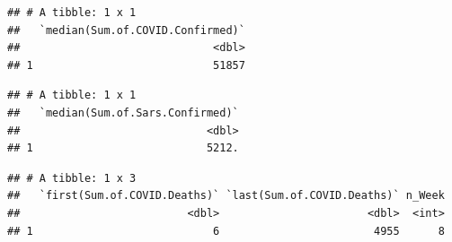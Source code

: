 \documentclass[
]{article}
\newenvironment{Shaded}{\begin{snugshade}}{\end{snugshade}}
\newcommand{\DataTypeTok}[1]{\textcolor[rgb]{0.13,0.29,0.53}{#1}}
\newcommand{\DecValTok}[1]{\textcolor[rgb]{0.00,0.00,0.81}{#1}}
\newcommand{\KeywordTok}[1]{\textcolor[rgb]{0.13,0.29,0.53}{\textbf{#1}}}
\newcommand{\NormalTok}[1]{#1}
\newcommand{\OperatorTok}[1]{\textcolor[rgb]{0.81,0.36,0.00}{\textbf{#1}}}
\newcommand{\StringTok}[1]{\textcolor[rgb]{0.31,0.60,0.02}{#1}}
\begin{document}
\begin{Shaded}
\end{Shaded}

\begin{verbatim}
## # A tibble: 1 x 1
##   `median(Sum.of.COVID.Confirmed)`
##                              <dbl>
## 1                            51857
\end{verbatim}

\begin{Shaded}
\end{Shaded}

\begin{verbatim}
## # A tibble: 1 x 1
##   `median(Sum.of.Sars.Confirmed)`
##                             <dbl>
## 1                           5212.
\end{verbatim}

\begin{Shaded}
\end{Shaded}

\begin{verbatim}
## # A tibble: 1 x 3
##   `first(Sum.of.COVID.Deaths)` `last(Sum.of.COVID.Deaths)` n_Week
##                          <dbl>                       <dbl>  <int>
## 1                            6                        4955      8
\end{verbatim}

\begin{Shaded}
\end{Shaded}
\end{document}
